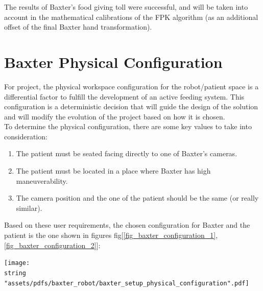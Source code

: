 \documentclass[11pt]{report} %
\begin{document}
The results of Baxter's food giving toll were successful, and will be taken into account in the mathematical calibrations of the FPK algorithm (as an additional offset of the final Baxter hand transformation).\\

\section{Baxter Physical Configuration}

For  project, the physical workspace configuration for the robot/patient space is a differential factor to fulfill the development of an active feeding system. This configuration is a deterministic decision that will guide the design of the solution and will modify the evolution of the project based on how it is chosen.\\

To determine the physical configuration, there are some key values to take into consideration:

\begin{enumerate}
    \item The patient must be seated facing directly to one of Baxter's cameras.
    \item The patient must be located in a place where Baxter has high maneuverability.
    \item The camera position and the one of the patient should be the same (or really similar).
\end{enumerate}

Based on these user requirements, the chosen configuration for Baxter and the patient is the one shown in figures fig[\ref{fig_baxter_configuration_1},\ref{fig_baxter_configuration_2}]:

\begin{center}
\texttt{[image: \\string "assets/pdfs/baxter\_robot/baxter\_setup\_physical\_configuration".pdf]}
\bigbreak
\begin{minipage}{\linewidth} %
\label{fig_baxter_configuration_1}
\end{minipage} \end{center}
\end{document}
